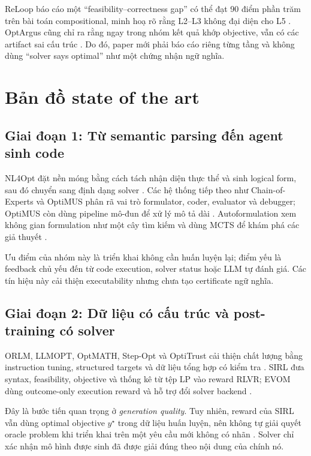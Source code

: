 \documentclass[11pt,a4paper]{article}
\begin{document}
ReLoop báo cáo một ``feasibility--correctness gap'' có thể đạt 90 điểm phần trăm trên bài toán compositional, minh hoạ rõ rằng L2--L3 không đại diện cho L5 \parencite{lian2026reloop}. OptArgus cũng chỉ ra rằng ngay trong nhóm kết quả khớp objective, vẫn có các artifact sai cấu trúc \parencite{li2026optargus}. Do đó, paper mới phải báo cáo riêng từng tầng và không dùng ``solver says optimal'' như một chứng nhận ngữ nghĩa.

\section{Bản đồ state of the art}

\subsection{Giai đoạn 1: Từ semantic parsing đến agent sinh code}

NL4Opt đặt nền móng bằng cách tách nhận diện thực thể và sinh logical form, sau đó chuyển sang định dạng solver \parencite{ramamonjison2022augmenting,ramamonjison2023nl4opt}. Các hệ thống tiếp theo như Chain-of-Experts và OptiMUS phân rã vai trò formulator, coder, evaluator và debugger; OptiMUS còn dùng pipeline mô-đun để xử lý mô tả dài \parencite{xiao2024chain,ahmaditeshnizi2024optimus}. Autoformulation xem không gian formulation như một cây tìm kiếm và dùng MCTS để khám phá các giả thuyết \parencite{astorga2024autoformulation}.

Ưu điểm của nhóm này là triển khai không cần huấn luyện lại; điểm yếu là feedback chủ yếu đến từ code execution, solver status hoặc LLM tự đánh giá. Các tín hiệu này cải thiện executability nhưng chưa tạo certificate ngữ nghĩa.

\subsection{Giai đoạn 2: Dữ liệu có cấu trúc và post-training có solver}

ORLM, LLMOPT, OptMATH, Step-Opt và OptiTrust cải thiện chất lượng bằng instruction tuning, structured targets và dữ liệu tổng hợp có kiểm tra \parencite{huang2025orlm,jiang2024llmopt,lu2025optmath,wu2025stepopt,lima2025optitrust}. SIRL đưa syntax, feasibility, objective và thống kê từ tệp LP vào reward RLVR; EVOM dùng outcome-only execution reward và hỗ trợ đổi solver backend \parencite{chen2025sirl,guan2026evom}.

Đây là bước tiến quan trọng ở \emph{generation quality}. Tuy nhiên, reward của SIRL vẫn dùng optimal objective \(y^\star\) trong dữ liệu huấn luyện, nên không tự giải quyết oracle problem khi triển khai trên một yêu cầu mới không có nhãn \parencite{chen2025sirl}. Solver chỉ xác nhận mô hình được sinh đã được giải đúng theo nội dung của chính nó.
\end{document}
